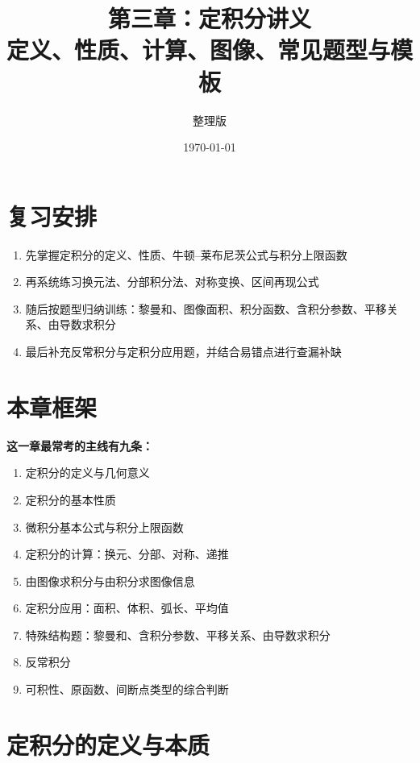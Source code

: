 \documentclass[12pt,a4paper]{ctexart}
\title{\textbf{第三章：定积分讲义}\\[4pt]\large 定义、性质、计算、图像、常见题型与模板}
\author{整理版}
\date{\today}
\begin{document}
\maketitle
\tableofcontents
\newpage

\section{复习安排}

\begin{methodbox}
\begin{enumerate}
  \item 先掌握定积分的定义、性质、牛顿--莱布尼茨公式与积分上限函数
  \item 再系统练习换元法、分部积分法、对称变换、区间再现公式
  \item 随后按题型归纳训练：黎曼和、图像面积、积分函数、含积分参数、平移关系、由导数求积分
  \item 最后补充反常积分与定积分应用题，并结合易错点进行查漏补缺
\end{enumerate}
\end{methodbox}

\section{本章框架}

\begin{keybox}
\textbf{这一章最常考的主线有九条：}
\begin{enumerate}
  \item 定积分的定义与几何意义
  \item 定积分的基本性质
  \item 微积分基本公式与积分上限函数
  \item 定积分的计算：换元、分部、对称、递推
  \item 由图像求积分与由积分求图像信息
  \item 定积分应用：面积、体积、弧长、平均值
  \item 特殊结构题：黎曼和、含积分参数、平移关系、由导数求积分
  \item 反常积分
  \item 可积性、原函数、间断点类型的综合判断
\end{enumerate}
\end{keybox}

\section{定积分的定义与本质}
\end{document}
